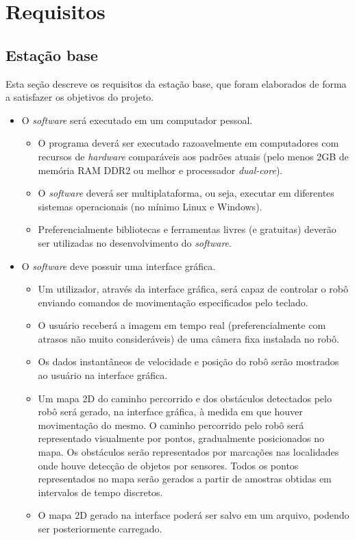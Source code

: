 \section{Requisitos}


\subsection{Estação base}
%
Esta seção descreve os requisitos da estação base, que foram elaborados de forma a satisfazer os objetivos do projeto.

\begin{itemize} %

  \item O \textit{software} será executado em um computador pessoal.
    \begin{itemize}
      \item O programa deverá ser executado razoavelmente em computadores com recursos de \textit{hardware} comparáveis aos padrões atuais (pelo menos 2GB de memória RAM DDR2 ou melhor e processador \textit{dual-core}).
      \item O \textit{software} deverá ser multiplataforma, ou seja, executar em diferentes sistemas operacionais (no mínimo Linux e Windows).
      \item Preferencialmente bibliotecas e ferramentas livres (e gratuitas) deverão ser utilizadas no desenvolvimento do \textit{software}.
    \end{itemize}

  \item O \textit{software} deve possuir uma interface gráfica.
    \begin{itemize}
      \item Um utilizador, através da interface gráfica, será capaz de controlar o robô enviando comandos de movimentação especificados pelo teclado. 
      \item O usuário receberá a imagem em tempo real (preferencialmente com atrasos não muito consideráveis) de uma câmera fixa instalada no robô. 
      \item Os dados instantâneos de velocidade e posição do robô serão mostrados ao usuário na interface gráfica.
      \item Um mapa 2D do caminho percorrido e dos obstáculos detectados pelo robô será gerado, na interface gráfica, à medida em que houver movimentação do mesmo. O caminho percorrido pelo robô será representado visualmente por pontos, gradualmente posicionados no mapa. Os obstáculos serão representados por marcações nas localidades onde houve detecção de objetos por sensores. Todos os pontos representados no mapa serão gerados a partir de amostras obtidas em intervalos de tempo discretos.
      \item O mapa 2D gerado na interface poderá ser salvo em um arquivo, podendo ser posteriormente carregado.
    \end{itemize}

\end{itemize} %



